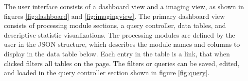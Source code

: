 The user interface consists of a dashboard view and a imaging view, as shown in figures \ref{fig:dashboard} and \ref{fig:imagingview}. The primary dashboard view consists of processing module sections, a query controller, data tables, and descriptive statistic visualizations. The processing modules are defined by the user in the JSON structure, which describes the module names and columns to display in the data table below. Each entry in the table is a link, that when clicked filters all tables on the page. The filters or queries can be saved, edited, and loaded in the query controller section shown in figure \ref{fig:query}. 